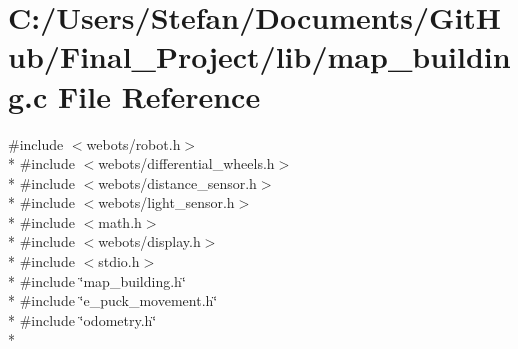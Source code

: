 \section{C\-:/\-Users/\-Stefan/\-Documents/\-Git\-Hub/\-Final\-\_\-\-Project/lib/map\-\_\-building.c File Reference}
\label{lib_2map__building_8c}
{\ttfamily \#include $<$webots/robot.\-h$>$}\\*
{\ttfamily \#include $<$webots/differential\-\_\-wheels.\-h$>$}\\*
{\ttfamily \#include $<$webots/distance\-\_\-sensor.\-h$>$}\\*
{\ttfamily \#include $<$webots/light\-\_\-sensor.\-h$>$}\\*
{\ttfamily \#include $<$math.\-h$>$}\\*
{\ttfamily \#include $<$webots/display.\-h$>$}\\*
{\ttfamily \#include $<$stdio.\-h$>$}\\*
{\ttfamily \#include \char`\"{}map\-\_\-building.\-h\char`\"{}}\\*
{\ttfamily \#include \char`\"{}e\-\_\-puck\-\_\-movement.\-h\char`\"{}}\\*
{\ttfamily \#include \char`\"{}odometry.\-h\char`\"{}}\\*
